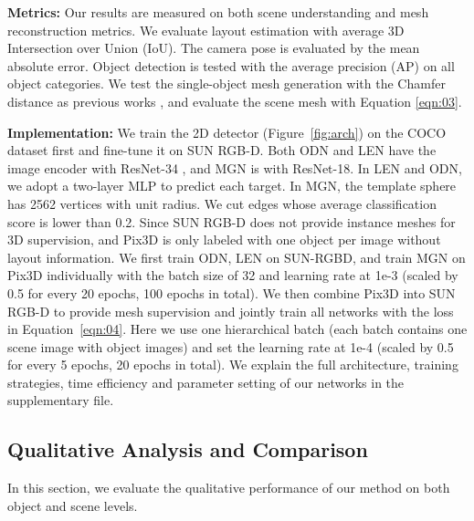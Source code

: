 \documentclass[10pt,twocolumn,letterpaper]{article}
\begin{document}
\noindent \textbf{Metrics:} Our results are measured on both scene understanding and mesh reconstruction metrics. We evaluate layout estimation with average 3D Intersection over Union (IoU). The camera pose is evaluated by the mean absolute error. Object detection is tested with the average precision (AP) on all object categories. We test the single-object mesh generation with the Chamfer distance as previous works \cite{gkioxari2019mesh,Junyi}, and evaluate the scene mesh with Equation \ref{eqn:03}.

\noindent \textbf{Implementation:} We train the 2D detector (Figure~\ref{fig:arch}) on the COCO dataset \cite{lin2014microsoft} first and fine-tune it on SUN RGB-D. Both ODN and LEN have the image encoder with ResNet-34 \cite{he2016deep}, and MGN is with ResNet-18. In LEN and ODN, we adopt a two-layer MLP to predict each target. In MGN, the template sphere has 2562 vertices with unit radius. We cut edges whose average classification score is lower than 0.2. Since SUN RGB-D does not provide instance meshes for 3D supervision, and Pix3D is only labeled with one object per image without layout information. We first train ODN, LEN on SUN-RGBD, and train MGN on Pix3D individually with the batch size of 32 and learning rate at 1e-3 (scaled by 0.5 for every 20 epochs, 100 epochs in total). We then combine Pix3D into SUN RGB-D to provide mesh supervision and jointly train all networks with the loss  in Equation~\ref{eqn:04}. Here we use one hierarchical batch (each batch contains one scene image with  object images) and set the learning rate at 1e-4 (scaled by 0.5 for every 5 epochs, 20 epochs in total). We explain the full architecture, training strategies, time efficiency and parameter setting of our networks in the supplementary file.

\subsection{Qualitative Analysis and Comparison}
In this section, we evaluate the qualitative performance of our method on both object and scene levels.
\end{document}
